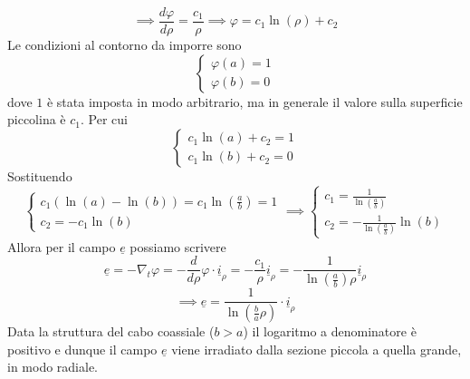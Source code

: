\documentclass{book}
\begin{document}
        \begin{equation}
            \implies \frac{d \varphi}{d \rho} = \frac{c_{1}}{\rho} \implies \varphi = c_{1} \ln (\rho) + c_{2}
        \end{equation}
        Le condizioni al contorno da imporre sono
        \begin{equation}
            \begin{cases}
            \varphi (a) = 1 \\
            \varphi (b) = 0
            \end{cases}
        \end{equation}
        dove $1$ è stata imposta in modo arbitrario, ma in generale il valore sulla superficie piccolina è $c_{1}$.
        Per cui
        \begin{equation}
            \begin{cases}
                c_{1} \ln (a)+c_{2} = 1 \\
                c_{1} \ln (b)+c_{2} = 0
            \end{cases}
        \end{equation}
        Sostituendo
        \begin{equation}
            \begin{cases}
            c_{1}(\ln(a)-\ln(b)) = c_{1} \ln(\frac{a}{b})= 1 \\
            c_{2} = -c_{1}\ln(b)
            \end{cases} \implies 
            \begin{cases}
            \displaystyle    c_{1} = \frac{1}{\ln (\frac{a}{b})} \\
            \displaystyle    c_{2} = -\frac{1}{\ln(\frac{a}{b})}\ln(b)
            \end{cases}
        \end{equation}
        Allora per il campo $\underline{e}$ possiamo scrivere
        \begin{equation}
            \underline{e} = - \nabla_{t} \varphi = - \frac{d}{d\rho} \varphi \cdot \underline{i}_{\rho} = - \frac{c_{1}}{\rho} \underline{i}_{\rho} = - \frac{1}{\displaystyle \ln(\frac{a}{b}) \rho} \underline{i}_{\rho}
         \end{equation}
         \begin{equation}
            \implies \underline{e} = \frac{1}{\ln (\frac{b}{a}\rho)} \cdot \underline{i}_{\rho}
         \end{equation}
         Data la struttura del cabo coassiale ($b>a$) il logaritmo a denominatore è positivo e dunque il campo $\underline{e}$ viene irradiato dalla sezione piccola a quella grande, in modo radiale.
\end{document}
